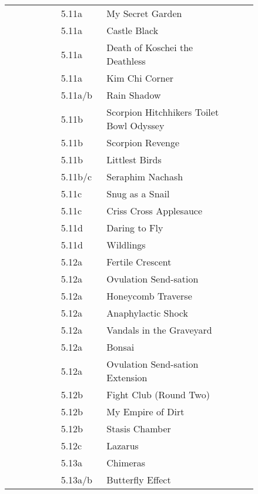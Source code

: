 \begin{flushleft}
\begin{center}
\begin{supertabular}{p{0.18\linewidth}p{0.13\linewidth}p{0.45\linewidth}p{0.08\linewidth}}
&5.11a&My Secret Garden & \pageref{rt:My Secret Garden} \\
&5.11a&Castle Black & \pageref{rt:Castle Black} \\
&5.11a&Death of Koschei the Deathless & \pageref{rt:Death of Koschei the Deathless} \\
&5.11a&Kim Chi Corner & \pageref{rt:Kim Chi Corner} \\
&5.11a/b&Rain Shadow & \pageref{rt:Rain Shadow} \\
&5.11b&Scorpion Hitchhikers Toilet Bowl Odyssey & \pageref{rt:Scorpion Hitchhikers Toilet Bowl Odyssey} \\
&5.11b&Scorpion Revenge & \pageref{rt:Scorpion Revenge} \\
&5.11b&Littlest Birds & \pageref{rt:Littlest Birds} \\
&5.11b/c&Seraphim Nachash & \pageref{rt:Seraphim Nachash} \\
&5.11c&Snug as a Snail & \pageref{rt:Snug as a Snail} \\
&5.11c&Criss Cross Applesauce & \pageref{rt:Criss Cross Applesauce} \\
&5.11d&Daring to Fly & \pageref{rt:Daring to Fly} \\
&5.11d&Wildlings & \pageref{rt:Wildlings} \\
&5.12a&Fertile Crescent & \pageref{rt:Fertile Crescent} \\
&5.12a&Ovulation Send-sation & \pageref{rt:Ovulation Send-sation} \\
&5.12a&Honeycomb Traverse & \pageref{vr:Honeycomb Traverse} \\
&5.12a&Anaphylactic Shock & \pageref{rt:Anaphylactic Shock} \\
&5.12a&Vandals in the Graveyard & \pageref{rt:Vandals in the Graveyard} \\
&5.12a&Bonsai & \pageref{rt:Bonsai} \\
&5.12a&Ovulation Send-sation Extension & \pageref{vr:Ovulation Send-sation Extension} \\
&5.12b&Fight Club (Round Two) & \pageref{rt:Fight Club (Round Two)} \\
&5.12b&My Empire of Dirt & \pageref{rt:My Empire of Dirt} \\
&5.12b&Stasis Chamber & \pageref{rt:Stasis Chamber} \\
&5.12c&Lazarus & \pageref{vr:Lazarus} \\
&5.13a&Chimeras & \pageref{rt:Chimeras} \\
&5.13a/b&Butterfly Effect & \pageref{rt:Butterfly Effect} \\
\end{supertabular}
\end{center}

\end{flushleft}
